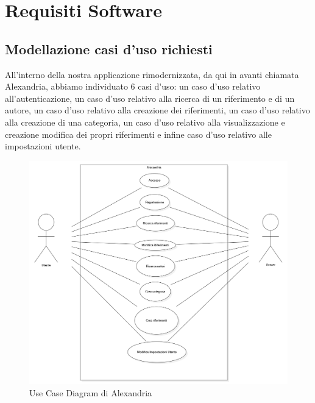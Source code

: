 \chapter{Requisiti Software}
\raggedright{\section{Modellazione casi d'uso richiesti}}
All'interno della nostra applicazione rimodernizzata, da qui in avanti chiamata \gls{Alexandria}, abbiamo individuato 6 \gls{casi d'uso}: un caso d'uso relativo all'autenticazione, un caso d'uso relativo alla ricerca di un \gls{riferimento} e di un \gls{autore}, un caso d'uso relativo alla creazione dei riferimenti, un caso d'uso relativo alla creazione di una \gls{categoria}, un caso d'uso relativo alla visualizzazione e creazione modifica dei propri riferimenti e infine caso d'uso relativo alle impostazioni utente.
\begin{figure}[H]
    \centering
        \includegraphics[width=.90\textwidth]{Immagini/Alexandria/useCase.png} 
    \caption{Use Case Diagram di Alexandria}
\end{figure}

